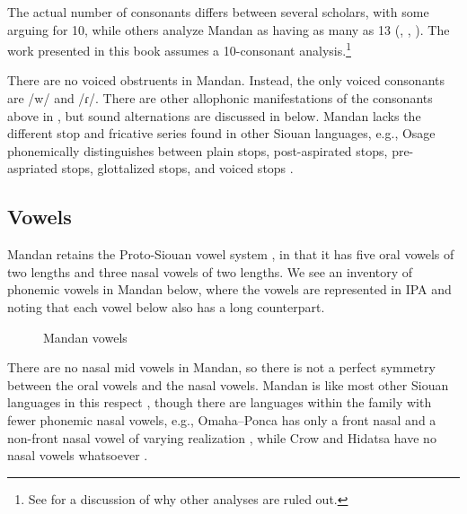 The actual number of consonants differs between several scholars, with some arguing for 10, while others analyze Mandan as having as many as 13 (\citealt[2]{kennard1936}, \citealt[14]{hollow1970}, \citealt[6]{mixco1997a}). The work presented in this book assumes a 10-consonant analysis.\footnote{See  for a discussion of why other analyses are ruled out.}

There are no voiced obstruents in Mandan. Instead, the only voiced consonants are /w/ and /ɾ/. There are other allophonic manifestations of the consonants above in , but sound alternations are discussed in  below. Mandan lacks the different stop and fricative series found in other Siouan languages, e.g., Osage phonemically distinguishes between plain stops, post-aspirated stops, pre-aspriated stops, glottalized stops, and voiced stops \citep[25]{quintero1997}.

\subsection{Vowels}\label{CHSk1.2}

Mandan retains the Proto-Siouan vowel system \citep[367]{rankinetalnd}, in that it has five oral vowels of two lengths and three nasal vowels of two lengths. We see an inventory of phonemic vowels in Mandan below, where the vowels are represented in IPA and noting that each vowel below also has a long counterpart.

\begin{figure}
\caption{Mandan vowels}
\end{figure}

There are no nasal mid vowels in Mandan, so there is not a perfect symmetry between the oral vowels and the nasal vowels. Mandan is like most other Siouan languages in this respect \citep[106]{parksrankin2001}, though there are languages within the family with fewer phonemic nasal vowels, e.g., Omaha--Ponca has only a front nasal and a non-front nasal vowel of varying realization \citep[12]{Koontz1984}, while Crow and Hidatsa have no nasal vowels whatsoever \citep[19]{grimm2012}.

